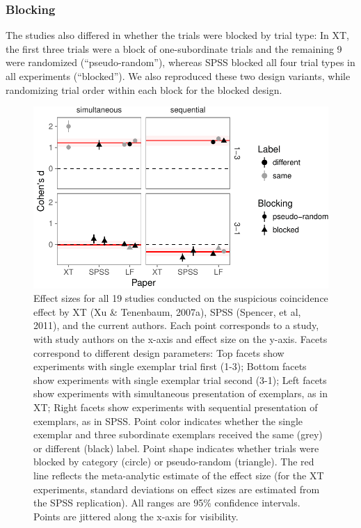 \documentclass[english,floatsintext,man]{apa6}
\newcounter{author}
\theoremstyle{definition}
\theoremstyle{definition}
\theoremstyle{definition}
\theoremstyle{remark}
\begin{document}
\subsubsection{Blocking}\label{blocking}

The studies also differed in whether the trials were blocked by trial
type: In XT, the first three trials were a block of one-subordinate
trials and the remaining 9 were randomized (\enquote{pseudo-random}),
whereas SPSS blocked all four trial types in all experiments
(\enquote{blocked}). We also reproduced these two design variants, while
randomizing trial order within each block for the blocked design.

\begin{figure}
\centering
\includegraphics{xtmem_files/figure-latex/unnamed-chunk-4-1.pdf}
\caption{\label{fig:unnamed-chunk-4}Effect sizes for all 19 studies
conducted on the suspicious coincidence effect by XT (Xu \& Tenenbaum,
2007a), SPSS (Spencer, et al, 2011), and the current authors. Each point
corresponds to a study, with study authors on the x-axis and effect size
on the y-axis. Facets correspond to different design parameters: Top
facets show experiments with single exemplar trial first (1-3); Bottom
facets show experiments with single exemplar trial second (3-1); Left
facets show experiments with simultaneous presentation of exemplars, as
in XT; Right facets show experiments with sequential presentation of
exemplars, as in SPSS. Point color indicates whether the single exemplar
and three subordinate exemplars received the same (grey) or different
(black) label. Point shape indicates whether trials were blocked by
category (circle) or pseudo-random (triangle). The red line reflects the
meta-analytic estimate of the effect size (for the XT experiments,
standard deviations on effect sizes are estimated from the SPSS
replication). All ranges are 95\% confidence intervals. Points are
jittered along the x-axis for visibility.}
\end{figure}
\end{document}
